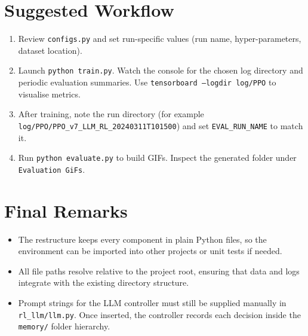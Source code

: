 \documentclass[12pt]{article}
\begin{document}
\section{Suggested Workflow}
\begin{enumerate}[leftmargin=1.2cm]
  \item Review \texttt{configs.py} and set run-specific values (run name, hyper-parameters, dataset location).
  \item Launch \texttt{python train.py}. Watch the console for the chosen log directory and periodic evaluation summaries. Use \texttt{tensorboard --logdir log/PPO} to visualise metrics.
  \item After training, note the run directory (for example \texttt{log/PPO/PPO\_v7\_LLM\_RL\_20240311T101500}) and set \texttt{EVAL\_RUN\_NAME} to match it.
  \item Run \texttt{python evaluate.py} to build GIFs. Inspect the generated folder under \texttt{Evaluation GiFs}.
\end{enumerate}

\section{Final Remarks}
\begin{itemize}[leftmargin=1.2cm]
  \item The restructure keeps every component in plain Python files, so the environment can be imported into other projects or unit tests if needed.
  \item All file paths resolve relative to the project root, ensuring that data and logs integrate with the existing directory structure.
  \item Prompt strings for the LLM controller must still be supplied manually in \texttt{rl\_llm/llm.py}. Once inserted, the controller records each decision inside the \texttt{memory/} folder hierarchy.
\end{itemize}
\end{document}
